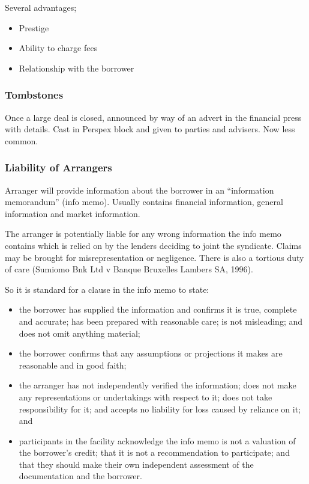 \documentclass[
]{article}
\providecommand{\tightlist}{%
  \setlength{\itemsep}{0pt}\setlength{\parskip}{0pt}}
\begin{document}
Several advantages;

\begin{itemize}
\tightlist
\item
  Prestige
\item
  Ability to charge fees
\item
  Relationship with the borrower
\end{itemize}

\hypertarget{tombstones}{%
\subsubsection{Tombstones}\label{tombstones}}

Once a large deal is closed, announced by way of an advert in the
financial press with details. Cast in Perspex block and given to parties
and advisers. Now less common.

\hypertarget{liability-of-arrangers}{%
\subsubsection{Liability of Arrangers}\label{liability-of-arrangers}}

Arranger will provide information about the borrower in an ``information
memorandum'' (info memo). Usually contains financial information,
general information and market information.

The arranger is potentially liable for any wrong information the info
memo contains which is relied on by the lenders deciding to joint the
syndicate. Claims may be brought for misrepresentation or negligence.
There is also a tortious duty of care (Sumiomo Bnk Ltd v Banque
Bruxelles Lambers SA, 1996).

So it is standard for a clause in the info memo to state:

\begin{itemize}
\tightlist
\item
  the borrower has supplied the information and confirms it is true,
  complete and accurate; has been prepared with reasonable care; is not
  misleading; and does not omit anything material;
\item
  the borrower confirms that any assumptions or projections it makes are
  reasonable and in good faith;
\item
  the arranger has not independently verified the information; does not
  make any representations or undertakings with respect to it; does not
  take responsibility for it; and accepts no liability for loss caused
  by reliance on it; and
\item
  participants in the facility acknowledge the info memo is not a
  valuation of the borrower's credit; that it is not a recommendation to
  participate; and that they should make their own independent
  assessment of the documentation and the borrower.
\end{itemize}
\end{document}
